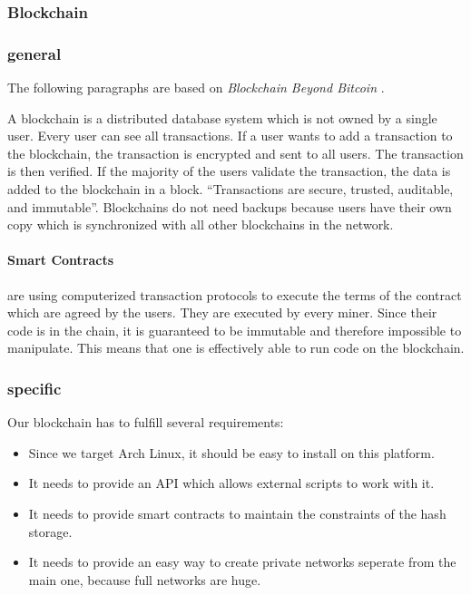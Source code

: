 \subsubsection{Blockchain} \label{sec:blockchain}

\subsubsection*{general}
The following paragraphs are based on \emph{Blockchain Beyond Bitcoin} \cite{Underwood}.

A blockchain is a distributed database system which is not owned by a single user. Every user can see all transactions. If a user wants to add a transaction to the blockchain, the transaction is encrypted and sent to all users. The transaction is then verified. If the majority of the users validate the transaction, the data is added to the blockchain in a block. ``Transactions are secure, trusted, auditable, and immutable''. Blockchains do not need backups because users have their own copy which is synchronized with all other blockchains in the network.

\paragraph*{Smart Contracts} are using computerized transaction protocols to execute the terms of the contract which are agreed by the users. They are executed by every miner. Since their code is in the chain, it is guaranteed to be immutable and therefore impossible to manipulate. This means that one is effectively able to run code on the blockchain.

\subsubsection*{specific}
Our blockchain has to fulfill several requirements:
\begin{itemize}
	\item Since we target Arch Linux, it should be easy to install on this platform.
	\item It needs to provide an API which allows external scripts to work with it.
	\item It needs to provide smart contracts to maintain the constraints of the hash storage.
	\item It needs to provide an easy way to create private networks seperate from the main one, because full networks are huge.
\end{itemize}

